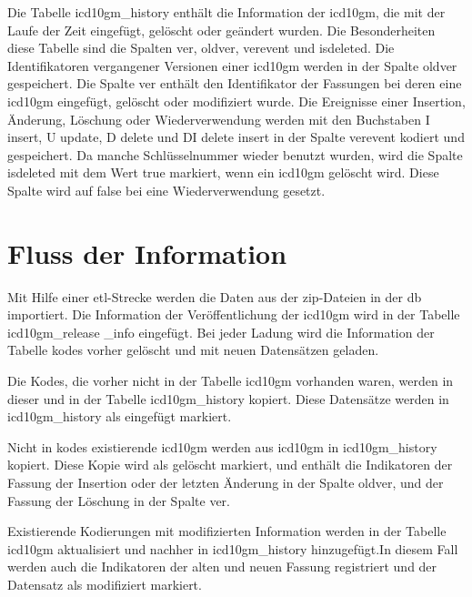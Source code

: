 Die Tabelle \textsf{icd10gm\_history} enthält die Information der \ac{icd10gm}, die mit der Laufe der Zeit eingefügt, gelöscht oder geändert wurden. Die Besonderheiten diese Tabelle sind die Spalten \textsf{ver}, \textsf{oldver}, \textsf{verevent} und \textsf{isdeleted}. Die Identifikatoren vergangener Versionen einer \ac{icd10gm} werden in der Spalte \textsf{oldver} gespeichert. Die Spalte \textsf{ver} enthält den Identifikator der Fassungen bei deren eine \ac{icd10gm} eingefügt, gelöscht oder modifiziert wurde. Die Ereignisse einer Insertion, Änderung, Löschung oder Wiederverwendung werden mit den Buchstaben \textsf{I} \glqq\textsf{insert}\grqq{}, \textsf{U} \glqq\textsf{update}\grqq{}, \textsf{D} \glqq\textsf{delete}\grqq{} und \textsf{DI} \glqq\textsf{delete insert}\grqq{} in der Spalte \textsf{verevent} kodiert und gespeichert. Da manche Schlüsselnummer wieder benutzt wurden, wird die Spalte \textsf{isdeleted} mit dem Wert \textsf{true} markiert, wenn ein \ac{icd10gm} gelöscht wird. Diese Spalte wird auf \textsf{false} bei eine Wiederverwendung gesetzt.

\section{Fluss der Information} \label{sec:dbrun}

Mit Hilfe einer \ac{etl}-Strecke werden die Daten aus der \ac{zip}-Dateien in der \ac{db} importiert. Die Information der Veröffentlichung der \ac{icd10gm} wird in der Tabelle \textsf{icd10gm\_release \_info} eingefügt. Bei jeder Ladung wird die Information der Tabelle \textsf{kodes} vorher gelöscht und mit neuen Datensätzen geladen. 

Die Kodes, die vorher nicht in der Tabelle \textsf{icd10gm} vorhanden waren, werden in dieser und in der Tabelle \textsf{icd10gm\_history} kopiert. Diese Datensätze werden in \textsf{icd10gm\_history} als eingefügt markiert. 

Nicht in \textsf{kodes} existierende \ac{icd10gm} werden aus \textsf{icd10gm} in \textsf{icd10gm\_history} kopiert. Diese Kopie wird als gelöscht markiert, und enthält die Indikatoren der Fassung der Insertion oder der letzten Änderung in der Spalte \textsf{oldver}, und der Fassung der Löschung in der Spalte \textsf{ver}. 

Existierende Kodierungen mit modifizierten Information werden in der Tabelle \textsf{icd10gm} aktualisiert und nachher in \textsf{icd10gm\_history} hinzugefügt.In diesem Fall werden auch die Indikatoren der alten und neuen Fassung registriert und der Datensatz als modifiziert markiert.

